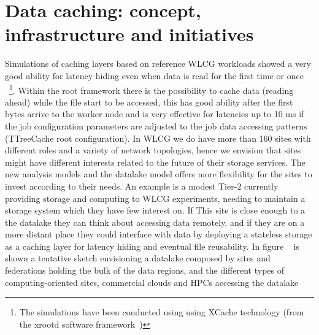 \section{Data caching: concept, infrastructure and initiatives}
Simulations of caching layers based on reference WLCG workloads showed a very good ability for latency hiding even when data is read for the first time or once ~\footnote{The simulations have been conducted using using XCache technology (from the xrootd software framework~\cite{xroot})}.
Within the root framework \cite{root} there is the possibility to cache data (reading ahead) while the file start to be accessed, this has good ability after the first bytes arrive to the worker node and is very effective for latencies up to 10 ms if the job configuration parameters are adjusted to the job data accessing patterns (TTreeCache root configuration). In WLCG we do have more than 160 sites with different roles and a variety of network topologies, hence we envision that sites might have different interests related to the future of their storage services. The new analysis models and the datalake model offers more flexibility for the sites to invest according to their needs. An example is a modest Tier-2 currently providing storage and computing to WLCG experiments, needing to maintain a storage system which they have few interest on. If This site is close enough to a the datalake they can think about accessing data remotely, and if they are on a more distant place they could interface with data by deploying a stateless storage as a caching layer for latency hiding and eventual file reusability. In figure ~ is shown a tentative sketch envisioning a datalake composed by sites and federations holding the bulk of the data regions, and the different types of computing-oriented sites, commercial clouds and HPCs accessing the datalake\\

